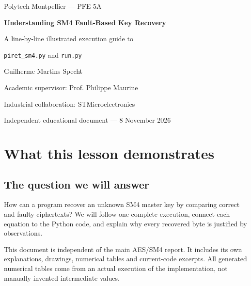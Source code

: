 \documentclass[11pt,a4paper]{report}
\begin{document}
\hypersetup{pageanchor=false}
\begin{titlepage}
\centering
\vspace*{15mm}
{\Large Polytech Montpellier --- PFE 5A\par}
\vspace{12mm}
{\Huge\bfseries Understanding SM4 Fault-Based Key Recovery\par}
\vspace{8mm}
{\LARGE A line-by-line illustrated execution guide to\par}
\vspace{3mm}
{\Large\texttt{piret\_sm4.py} and \texttt{run.py}\par}
\vspace{15mm}
\vfill
{\large Guilherme Martins Specht\par}
\vspace{3mm}
Academic supervisor: Prof. Philippe Maurine\par
Industrial collaboration: STMicroelectronics\par
\vspace{8mm}
Independent educational document --- 8 November 2026\par
\end{titlepage}
\hypersetup{pageanchor=true}
\tableofcontents
\clearpage
{}

\chapter{What this lesson demonstrates}
\section{The question we will answer}
How can a program recover an unknown SM4 master key by comparing correct and faulty ciphertexts? We will follow one complete execution, connect each equation to the Python code, and explain why every recovered byte is justified by observations.

This document is independent of the main AES/SM4 report. It includes its own explanations, drawings, numerical tables and current-code excerpts. All generated numerical tables come from an actual execution of the implementation, not manually invented intermediate values.
\end{document}
